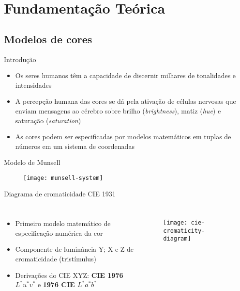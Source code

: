 \section{Fundamentação Teórica}
\subsection{Modelos de cores}

\begin{frame}{Introdução}
\begin{itemize}
    \item Os seres humanos têm a capacidade de discernir milhares de tonalidades e intensidades
    \item A percepção humana das cores se dá pela ativação de células nervosas que enviam mensagens ao cérebro sobre brilho (\textit{brightness}), matiz (\textit{hue}) e saturação (\textit{saturation})
    \item As cores podem ser especificadas por modelos matemáticos em tuplas de números em um sistema de coordenadas
\end{itemize}
\end{frame}

\begin{frame}{Modelo de Munsell}
\begin{figure}[!h]
  \centering
  \texttt{[image: munsell-system]}
\end{figure}
\end{frame}

\begin{frame}{Diagrama de cromaticidade CIE 1931}
\begin{columns}
\begin{itemize}
    \item Primeiro modelo matemático de especificação numérica da cor
    \item Componente de luminância Y; X e Z de cromaticidade (tristímulus)
    \item Derivações do CIE XYZ: \textbf{CIE 1976 $L^*u^*v^*$} e \textbf{1976 CIE $L^*a^*b^*$}
\end{itemize}
\begin{figure}[!h]
  \centering
  \texttt{[image: cie-cromaticity-diagram]}
\end{figure}
\end{columns}
\end{frame}

